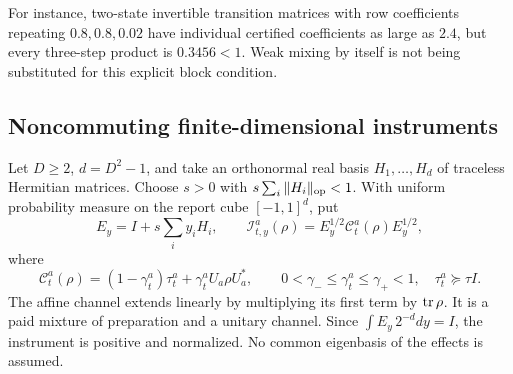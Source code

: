 For instance, two-state invertible transition matrices with row coefficients repeating $0.8,0.8,0.02$ have individual certified coefficients as large as $2.4$, but every three-step product is $0.3456<1$. Weak mixing by itself is not being substituted for this explicit block condition.

\subsection{Noncommuting finite-dimensional instruments}
Let $D\ge2$, $d=D^2-1$, and take an orthonormal real basis $H_1,\ldots,H_d$ of traceless Hermitian matrices. Choose $s>0$ with $s\sum_i\|H_i\|_{\rm op}<1$. With uniform probability measure on the report cube $[-1,1]^d$, put
\[
 E_y=I+s\sum_i y_iH_i,\qquad
 \mathcal I_{t,y}^a(\rho)=E_y^{1/2}\mathcal C_t^a(\rho)E_y^{1/2},
\]
where
\[
 \mathcal C_t^a(\rho)=(1-\gamma_t^a)\tau_t^a+
                    \gamma_t^a U_a\rho U_a^*,\qquad
 0<\gamma_-\le\gamma_t^a\le\gamma_+<1,\quad \tau_t^a\succeq\tau I.
\]
The affine channel extends linearly by multiplying its first term by $\operatorname{tr}\rho$. It is a paid mixture of preparation and a unitary channel. Since $\int E_y\,2^{-d}dy=I$, the instrument is positive and normalized. No common eigenbasis of the effects is assumed.


